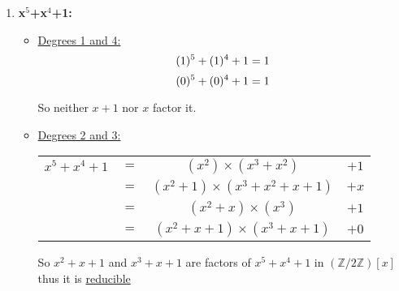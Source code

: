 \documentclass{article}
\numberwithin{equation}{subsection}
\begin{document}
	\vspace{10pt}
	\begin{enumerate}
		\item \textbf{x$^5$+x$^4$+1:}
			\begin{adjustwidth}{1em}{1em}
				\begin{itemize}
					\item \underline{Degrees 1 and 4:}
						\begin{equation}\notag
							(1)^5 + (1)^4 + 1 = 1
						\end{equation}
						\begin{equation}\notag
							(0)^5 + (0)^4 +1 = 1
						\end{equation}
						\par{
							So neither $x+1$ nor $x$ factor it.	
						}
					
					\vspace{15pt}
				\item \underline{Degrees 2 and 3:}
					\begin{center}
						\begin{tabular}{c c c c}
							$x^5+x^4+1$ & $=$ & $(x^2) \times (x^3+x^2)$ 			& $+1$\\
													&	$=$	&	$(x^2+1)\times (x^3+x^2+x+1)$	& $+ x$\\
													&	$=$	&	$(x^2+x)\times (x^3)$					&	$ + 1$\\
													&	$=$	&	$(x^2+x+1) \times (x^3+x+1)$	&	$+0$
						\end{tabular}
					\end{center}		
					\par{
						So $x^2+x+1$ and $x^3+x+1$ are factors of $x^5+x^4+1$ in $(\mathbb{Z}/2\mathbb{Z})[x]$ thus it is \underline{reducible}
					}
				\end{itemize}
			\end{adjustwidth}

	\end{enumerate}
		\newpage
		\thispagestyle{fancy}
\end{document}
